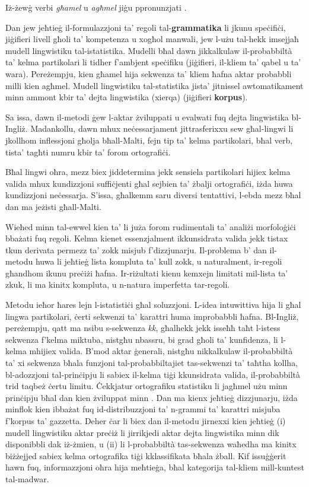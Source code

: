 \begin{multicols}{2}
Iż-żewġ verbi \emph{għamel}  u \emph{agħmel} jiġu ppronunzjati .

Dan jew jeħtieġ il-formulazzjoni ta’ regoli tal-\textbf{grammatika} li jkunu speċifiċi, jiġifieri livell għoli ta’ kompetenza u xogħol manwali, jew l-użu tal-hekk imsejjaħ mudell lingwistiku tal-istatistika. Mudelli bħal dawn jikkalkulaw il-probabbiltà ta’ kelma partikolari li tidher f’ambjent speċifiku (jiġifieri, il-kliem ta’ qabel u ta’ wara). Pereżempju, kien għamel hija sekwenza ta’ kliem ħafna aktar probabbli milli kien agħmel. Mudell lingwistiku tal-statistika jista’ jitnissel awtomatikament minn ammont kbir ta’ dejta lingwistika (xierqa) (jiġifieri \textbf{korpus}).

Sa issa, dawn il-metodi ġew l-aktar żviluppati u evalwati fuq dejta lingwistika bl-Ingliż. Madankollu, dawn mhux neċessarjament jittrasferixxu sew għal-lingwi li jkollhom inflessjoni għolja bħall-Malti, fejn tip ta’ kelma partikolari, bħal verb, tista’ tagħti numru kbir ta’ forom ortografiċi.

Bħal lingwi oħra, mezz biex jiddetermina jekk sensiela partikolari hijiex kelma valida mhux kundizzjoni suffiċjenti għal sejbien ta’ żbalji ortografiċi, iżda huwa kundizzjoni neċessarja. S’issa, għalkemm saru diversi tentattivi, l-ebda mezz bħal dan ma jeżisti għall-Malti.

Wieħed minn tal-ewwel kien ta’ \cite{Mangion:1999} li juża forom rudimentali ta’ analiżi morfoloġiċi bbażati fuq regoli. Kelma kienet essenzjalment ikkunsidrata valida jekk tistax tkun derivata permezz ta' zokk misjub f’dizzjunarju. Il-problema b’ dan il-metodu huwa li jeħtieġ lista kompluta ta’ kull zokk, u naturalment, ir-regoli għandhom ikunu preċiżi ħafna. Ir-riżultati kienu kemxejn limitati mil-lista ta’ zkuk, li ma kinitx kompluta, u n-natura imperfetta tar-regoli.

Metodu ieħor ħares lejn l-istatistiċi għal soluzzjoni. L-idea intuwittiva hija li għal lingwa partikolari, ċerti sekwenzi ta’ karattri huma improbabbli ħafna. Bl-Ingliż, pereżempju, qatt ma nsibu s-sekwenza \emph{kk}, għalhekk jekk isseħħ taħt l-istess sekwenza f’kelma miktuba, nistgħu nbassru, bi grad għoli ta’ kunfidenza, li l-kelma mhijiex valida. B’mod aktar ġenerali, nistgħu nikkalkulaw il-probabbiltà ta’ xi sekwenza bħala funzjoni tal-probabbiltajiet tas-sekwenzi ta’ taħtha kollha, bl-adozzjoni tal-prinċipju li sabiex il-kelma tiġi kkunsidrata valida, il-probabbiltà trid taqbeż ċertu limitu. Ċekkjatur ortografiku statistiku li jagħmel użu minn prinċipju bħal dan kien żviluppat minn \cite{Mizzi:2000}. Dan ma kienx jeħtieġ dizzjunarju, iżda minflok kien ibbażat fuq id-distribuzzjoni ta’ n-grammi ta' karattri misjuba f’korpus ta’ gazzetta. Deher ċar li biex dan il-metodu jirnexxi kien jeħtieġ (i) mudell lingwistiku aktar preċiż li jirrikjedi aktar dejta lingwistika minn dik disponibbli dak iż-żmien, u (ii) li l-probabbiltà tas-sekwenza waħedha ma kinitx biżżejjed sabiex kelma ortografika tiġi kklassifikata bħala żball. Kif issuġġerit hawn fuq, informazzjoni oħra hija meħtieġa, bħal kategorija tal-kliem mill-kuntest tal-madwar.


\end{multicols}
